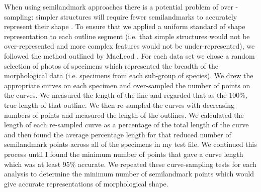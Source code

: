 \documentclass[12pt,a4paper]{article}
\begin{document}
	When using semilandmark approaches there is a potential problem of over - sampling: simpler structures will require fewer semilandmarks to accurately represent their shape  \citep{MacLeod2012}. To ensure that we applied a uniform standard of shape representation to each outline segment (i.e. that simple structures would not be over-represented and more complex features would not be under-represented), we followed the method outlined by MacLeod \citeyearpar{MacLeod2012}. For each data set we chose a random selection of photos of specimens which represented the breadth of the morphological data (i.e. specimens from each sub-group of species). We drew the appropriate curves on each specimen and over-sampled the number of points on the curves. We measured the length of the line and regarded that as the 100\%, true length of that outline. We then re-sampled the curves with decreasing numbers of points and measured the length of the outlines. We calculated the length of each re-sampled curve as a percentage of the total length of the curve and then found the average percentage length for that reduced number of semilandmark points across all of the specimens in my test file. We continued this process until I found the minimum number of points that gave a curve length which was at least 95\% accurate.  We repeated these curve-sampling tests for each analysis to determine the minimum number of semilandmark points which would give accurate representations of morphological shape.
	
\end{document}
